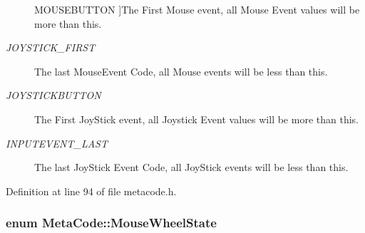 \begin{Desc}
\begin{description}
{{MOUSEBUTTON}
\label{d7/d72/classMetaCode_a7390e6f58e25c0ce377bba4e63081b24a90e6bf109b0decae5cc828ebc5934dfa}
}]The First Mouse event, all Mouse Event values will be more than this. \item[{\em 
\hypertarget{classMetaCode_a7390e6f58e25c0ce377bba4e63081b24aa3222db6ab303f525a1a0c87603d806c}{
JOYSTICK\_\-FIRST}
\label{d7/d72/classMetaCode_a7390e6f58e25c0ce377bba4e63081b24aa3222db6ab303f525a1a0c87603d806c}
}]The last MouseEvent Code, all Mouse events will be less than this. \item[{\em 
\hypertarget{classMetaCode_a7390e6f58e25c0ce377bba4e63081b24ab52ae2c161faf882271ec71ded86501f}{
JOYSTICKBUTTON}
\label{d7/d72/classMetaCode_a7390e6f58e25c0ce377bba4e63081b24ab52ae2c161faf882271ec71ded86501f}
}]The First JoyStick event, all Joystick Event values will be more than this. \item[{\em 
\hypertarget{classMetaCode_a7390e6f58e25c0ce377bba4e63081b24ad1ca5de26bcaae04a631fdaa13e5749f}{
INPUTEVENT\_\-LAST}
\label{d7/d72/classMetaCode_a7390e6f58e25c0ce377bba4e63081b24ad1ca5de26bcaae04a631fdaa13e5749f}
}]The last JoyStick Event Code, all JoyStick events will be less than this. \end{description}
\end{Desc}



Definition at line 94 of file metacode.h.\hypertarget{classMetaCode_a31155465656363d4ecdf9ce7ae5d7227}{
\subsubsection[{MouseWheelState}]{\setlength{\rightskip}{0pt plus 5cm}enum {\bf MetaCode::MouseWheelState}}}
\label{d7/d72/classMetaCode_a31155465656363d4ecdf9ce7ae5d7227}


